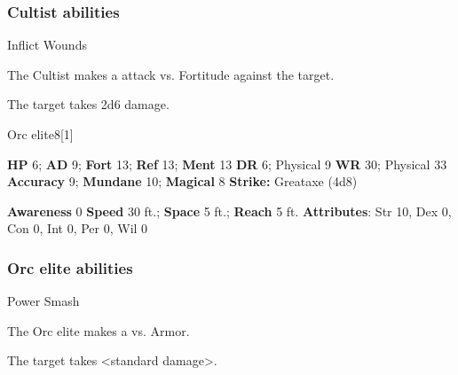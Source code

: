   \subsubsection{Cultist abilities}
        
    \begin{freeability}{Inflict Wounds}
      
    
      The Cultist makes a  attack
        vs. Fortitude against the target.
    
    \hit The target takes 2d6  damage.
    
  
    \end{freeability}
  
  \begin{monsection}{Orc elite}{8}[1]
    \vspace{-1em}\vspace{-1em}
    \begin{spellcontent}
      \begin{spelltargetinginfo}
        \pari \textbf{HP} 6;
          \textbf{AD} 9;
          \textbf{Fort} 13;
          \textbf{Ref} 13;
          \textbf{Ment} 13
        \pari \textbf{DR} 6; Physical 9
        \pari \textbf{WR} 30; Physical 33
        \pari \textbf{Accuracy} 9;
          \textbf{Mundane} 10;
          \textbf{Magical} 8
        \pari \textbf{Strike:}
            Greataxe  (4d8)
      \end{spelltargetinginfo}
    \end{spellcontent}
    \begin{monsterfooter}
      \pari \textbf{Awareness} 0
      \pari \textbf{Speed} 30 ft.;
        \textbf{Space} 5 ft.;
        \textbf{Reach} 5 ft.
      \pari \textbf{Attributes}:
        Str 10, Dex 0, Con 0,
        Int 0, Per 0, Wil 0
    \end{monsterfooter}
  \end{monsection}
  \subsubsection{Orc elite abilities}
        
    \begin{freeability}{Power Smash}
      
    
      The Orc elite makes a   vs. Armor.
    
    \hit The target takes <standard damage>.
    
  
    \end{freeability}
  
